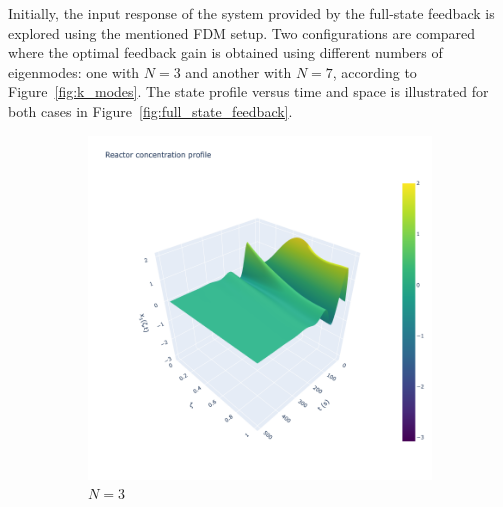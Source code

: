 Initially, the input response of the system provided by the full-state feedback is explored using the mentioned FDM setup. Two configurations are compared where the optimal feedback gain is obtained using different numbers of eigenmodes: one with $N=3$ and another with $N=7$, according to Figure~\ref{fig:k_modes}. The state profile versus time and space is illustrated for both cases in Figure~\ref{fig:full_state_feedback}. 

\begin{figure}[!htbp]
    \centering
    \begin{subfigure}[b]{0.45\textwidth}
        \includegraphics[width=\textwidth,trim=0 0 100 0,clip]{Figures/3D_x1_k3.png}
        \caption{$N=3$}
        \label{fig:3D_x1_k3}
    \end{subfigure}
    \hfill
    \begin{subfigure}[b]{0.45\textwidth}

\end{subfigure}
\end{figure}
